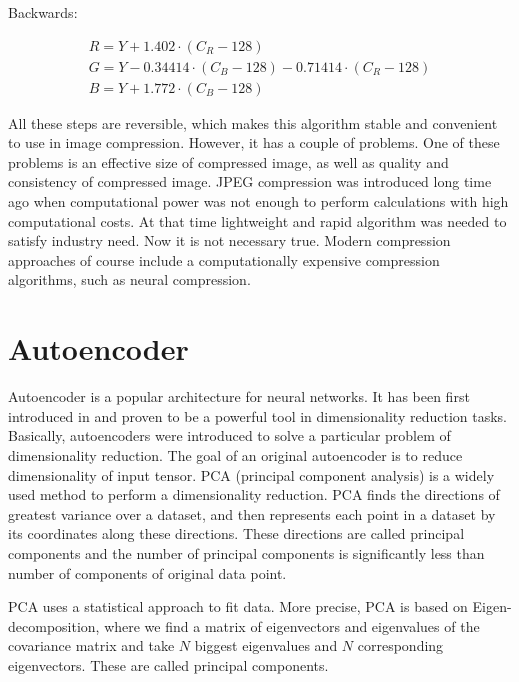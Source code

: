 Backwards:

\begin{equation}
    \label{eq:chroma-backward}
    \begin{split}
        R=Y+1.402\cdot (C_{R}-128) \\
        G=Y-0.34414\cdot (C_{B}-128)-0.71414\cdot (C_{R}-128) \\
        B=Y+1.772\cdot (C_{B}-128)
    \end{split}
\end{equation}

All these steps are reversible, which makes this algorithm stable and convenient to use in image compression. However, it has a couple of problems. One of these problems is an effective size of compressed image, as well as quality and consistency of compressed image. JPEG compression was introduced long time ago when computational power was not enough to perform calculations with high computational costs. At that time lightweight and rapid algorithm was needed to satisfy industry need. Now it is not necessary true. Modern compression approaches of course include a computationally expensive compression algorithms, such as neural compression.

\section{Autoencoder}

Autoencoder is a popular architecture for neural networks. It has been first introduced in \cite{Autoencoder_2006} and proven to be a powerful tool in dimensionality reduction tasks. Basically, autoencoders were introduced to solve a particular problem of dimensionality reduction. The goal of an original autoencoder is to reduce dimensionality of input tensor. PCA (principal component analysis) is a widely used method to perform a dimensionality reduction. PCA finds the directions of greatest variance over a dataset, and then represents each point in a dataset by its coordinates along these directions. These directions are called principal components and the number of principal components is significantly less than number of components of original data point.

PCA uses a statistical approach to fit data. More precise, PCA is based on Eigen-decomposition, where we find a matrix of eigenvectors and eigenvalues of the covariance matrix and take $N$ biggest eigenvalues and $N$ corresponding eigenvectors. These are called principal components.

